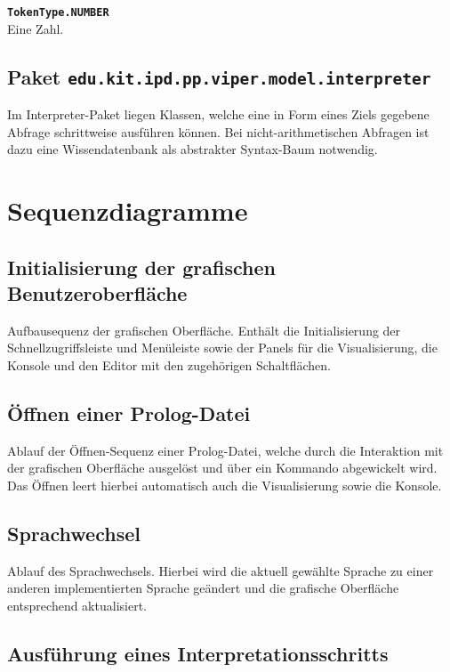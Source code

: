 \documentclass[parskip=full,11pt,twoside]{scrartcl}
\begin{document}
\textbf{\texttt{TokenType.NUMBER}}\\
Eine Zahl.

\subsection{Paket \texttt{edu.kit.ipd.pp.viper.model.interpreter}}

Im Interpreter-Paket liegen Klassen, welche eine in Form eines Ziels gegebene Abfrage schrittweise ausführen können. Bei nicht-arithmetischen Abfragen ist dazu eine Wissendatenbank als abstrakter Syntax-Baum notwendig.

\section{Sequenzdiagramme}

\subsection{Initialisierung der grafischen Benutzeroberfläche}

Aufbausequenz der grafischen Oberfläche. Enthält die Initialisierung der Schnellzugriffsleiste und Menüleiste sowie der Panels für die Visualisierung, die Konsole und den Editor mit den zugehörigen Schaltflächen.

\subsection{Öffnen einer Prolog-Datei}

Ablauf der Öffnen-Sequenz einer Prolog-Datei, welche durch die Interaktion mit der grafischen Oberfläche ausgelöst und über ein Kommando abgewickelt wird. Das Öffnen leert hierbei automatisch auch die Visualisierung sowie die Konsole.

\subsection{Sprachwechsel}

Ablauf des Sprachwechsels. Hierbei wird die aktuell gewählte Sprache zu einer anderen implementierten Sprache geändert und die grafische Oberfläche entsprechend aktualisiert.

\subsection{Ausführung eines Interpretationsschritts}
\end{document}
